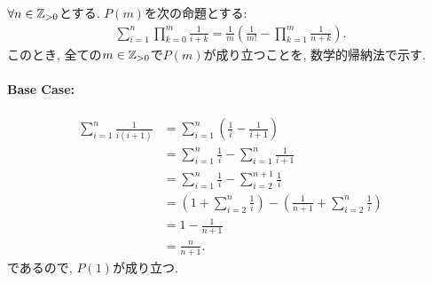 \begin{proof*}
  $\forall n \in \mathbb{Z}_{>0}$とする.
  $P(m)$を次の命題とする:
  \begin{align*}
   \sum_{i=1}^n\prod_{k=0}^{m}\frac{1}{i+k}=\frac{1}{m}\left(\frac{1}{m!}-\prod_{k=1}^m\frac{1}{n+k}\right).
  \end{align*}
  このとき,
  全ての$m\in\mathbb{Z}_{>0}$で$P(m)$が成り立つことを,
  数学的帰納法で示す.

  \paragraph{Base Case:}
  \begin{align*}
    \sum_{i=1}^n\frac{1}{i(i+1)}
    &=\sum_{i=1}^n(\frac{1}{i}-\frac{1}{i+1})\\
    &=\sum_{i=1}^n\frac{1}{i}-\sum_{i=1}^n\frac{1}{i+1}\\
    &=\sum_{i=1}^n\frac{1}{i}-\sum_{i=2}^{n+1}\frac{1}{i}\\
    &=(1+\sum_{i=2}^n\frac{1}{i})-(\frac{1}{n+1}+\sum_{i=2}^{n}\frac{1}{i})\\
    &=1-\frac{1}{n+1}\\
    &=\frac{n}{n+1}.
  \end{align*}
  であるので,
  $P(1)$が成り立つ.
  

\end{proof*}
